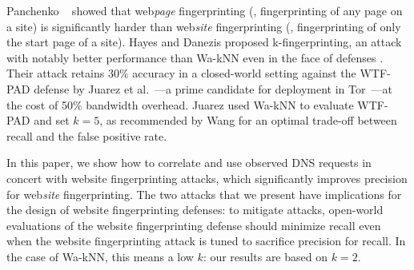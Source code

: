 Panchenko \ea~\cite{Panchenko2016a} showed that web\emph{page}
fingerprinting (\ie, fingerprinting of any page on a site) is
significantly harder than web\emph{site} fingerprinting (\ie,
fingerprinting of only the start page of a site).  Hayes and Danezis
proposed k-fingerprinting, an attack with notably better performance
than Wa-kNN even in the face of defenses
\cite{Hayes2016a}. Their attack retains 30\% accuracy in a
closed-world setting against the WTF-PAD defense by Juarez et
al.~\cite{Juarez2016a}---a prime candidate for
deployment in Tor~\cite{adapativepadding}---at the cost of 50\% bandwidth
overhead. Juarez \ea used Wa-kNN to evaluate WTF-PAD and set $k=5$, as
recommended by Wang \ea for an optimal trade-off between recall and the
false positive rate.

In this paper, we show how to correlate and use observed DNS requests in
concert with website fingerprinting attacks,
which significantly
improves precision for web\emph{site} fingerprinting.
The two \name attacks that we present have implications
for the design of website fingerprinting defenses:
to mitigate \name attacks, open-world evaluations of the website fingerprinting
defense should minimize recall even when the website fingerprinting attack is
tuned to sacrifice precision for recall.  In the case of Wa-kNN, this means
a low $k$: our results are based on $k=2$.
